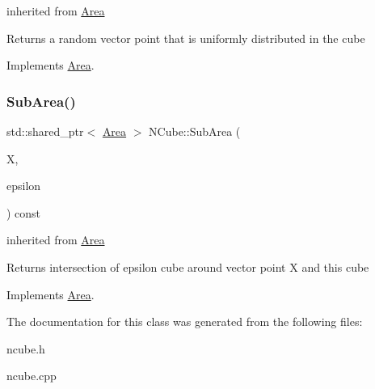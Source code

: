 inherited from \hyperlink{class_area}{Area} \begin{DoxyReturn}{Returns}
a random vector point that is uniformly distributed in the cube 
\end{DoxyReturn}


Implements \hyperlink{class_area_a8a921495c0cca4095c8386f7b48ef086}{Area}.

\mbox{\label{class_n_cube_a88be716167199c626d1c5063b6929303}} 
\subsubsection{\texorpdfstring{Sub\+Area()}{SubArea()}}
{\footnotesize\ttfamily std\+::shared\+\_\+ptr$<$ \hyperlink{class_area}{Area} $>$ N\+Cube\+::\+Sub\+Area (\begin{DoxyParamCaption}\item[{const \hyperlink{classv_point}{v\+Point} \&}]{X,  }\item[{double}]{epsilon }\end{DoxyParamCaption}) const\hspace{0.3cm}{\ttfamily [virtual]}}

inherited from \hyperlink{class_area}{Area} \begin{DoxyReturn}{Returns}
intersection of epsilon cube around vector point X and this cube 
\end{DoxyReturn}


Implements \hyperlink{class_area_a8f28e6be12d6b1bf7217f51307ab937e}{Area}.



The documentation for this class was generated from the following files\+:\begin{DoxyCompactItemize}
\item 
ncube.\+h\item 
ncube.\+cpp\end{DoxyCompactItemize}

